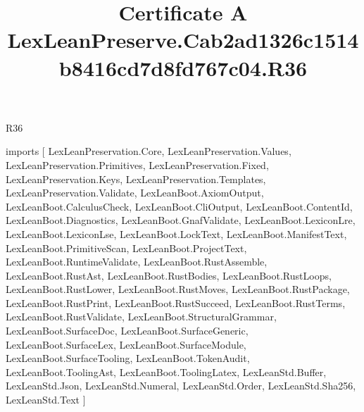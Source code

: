 \begin{lexlean}{R36}
\title{Certificate A LexLeanPreserve.Cab2ad1326c1514b8416cd7d8fd767c04.R36}
\begin{coremodule}
imports [
  LexLeanPreservation.Core,
  LexLeanPreservation.Values,
  LexLeanPreservation.Primitives,
  LexLeanPreservation.Fixed,
  LexLeanPreservation.Keys,
  LexLeanPreservation.Templates,
  LexLeanPreservation.Validate,
  LexLeanBoot.AxiomOutput,
  LexLeanBoot.CalculusCheck,
  LexLeanBoot.CliOutput,
  LexLeanBoot.ContentId,
  LexLeanBoot.Diagnostics,
  LexLeanBoot.GnafValidate,
  LexLeanBoot.LexiconLre,
  LexLeanBoot.LexiconLse,
  LexLeanBoot.LockText,
  LexLeanBoot.ManifestText,
  LexLeanBoot.PrimitiveScan,
  LexLeanBoot.ProjectText,
  LexLeanBoot.RuntimeValidate,
  LexLeanBoot.RustAssemble,
  LexLeanBoot.RustAst,
  LexLeanBoot.RustBodies,
  LexLeanBoot.RustLoops,
  LexLeanBoot.RustLower,
  LexLeanBoot.RustMoves,
  LexLeanBoot.RustPackage,
  LexLeanBoot.RustPrint,
  LexLeanBoot.RustSucceed,
  LexLeanBoot.RustTerms,
  LexLeanBoot.RustValidate,
  LexLeanBoot.StructuralGrammar,
  LexLeanBoot.SurfaceDoc,
  LexLeanBoot.SurfaceGeneric,
  LexLeanBoot.SurfaceLex,
  LexLeanBoot.SurfaceModule,
  LexLeanBoot.SurfaceTooling,
  LexLeanBoot.TokenAudit,
  LexLeanBoot.ToolingAst,
  LexLeanBoot.ToolingLatex,
  LexLeanStd.Buffer,
  LexLeanStd.Json,
  LexLeanStd.Numeral,
  LexLeanStd.Order,
  LexLeanStd.Sha256,
  LexLeanStd.Text
]


\end{coremodule}
\end{lexlean}
